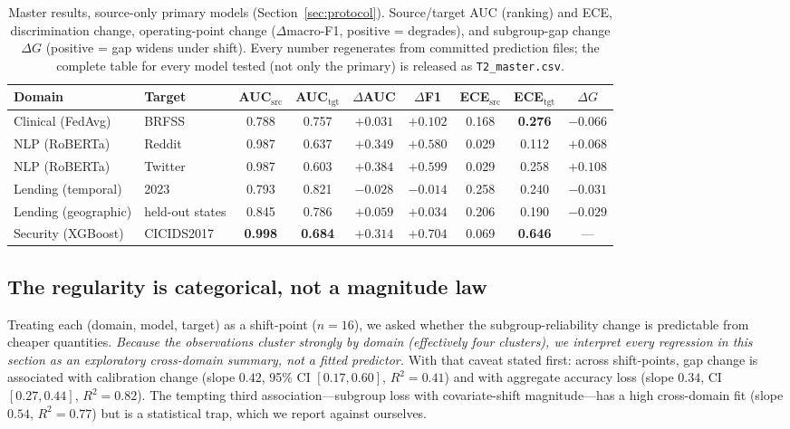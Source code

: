\documentclass[11pt]{article}
\begin{document}
\begin{table}[t]
\centering
\caption{Master results, source-only primary models (Section~\ref{sec:protocol}). Source/target
AUC (ranking) and ECE, discrimination change, operating-point change ($\Delta$macro-F1, positive
= degrades), and subgroup-gap change $\Delta G$ (positive = gap widens under shift). Every number
regenerates from committed prediction files; the complete table for every model tested (not only
the primary) is released as \texttt{T2\_master.csv}.}
\label{tab:master}
\scriptsize
\begin{tabular}{llccccccc}
\toprule
Domain & Target & AUC$_{\text{src}}$ & AUC$_{\text{tgt}}$ & $\Delta$AUC & $\Delta$F1 & ECE$_{\text{src}}$ & ECE$_{\text{tgt}}$ & $\Delta G$ \\
\midrule
\rowcolor{hlrow} Clinical (FedAvg) & BRFSS & 0.788 & 0.757 & $+0.031$ & $+0.102$ & 0.168 & \textbf{0.276} & $-0.066$ \\
NLP (RoBERTa) & Reddit & 0.987 & 0.637 & $\mathbf{+0.349}$ & $+0.580$ & 0.029 & 0.112 & $+0.068$ \\
NLP (RoBERTa) & Twitter & 0.987 & 0.603 & $\mathbf{+0.384}$ & $+0.599$ & 0.029 & 0.258 & $+0.108$ \\
Lending (temporal) & 2023 & 0.793 & 0.821 & $-0.028$ & $-0.014$ & 0.258 & 0.240 & $-0.031$ \\
Lending (geographic) & held-out states & 0.845 & 0.786 & $+0.059$ & $+0.034$ & 0.206 & 0.190 & $-0.029$ \\
Security (XGBoost) & CICIDS2017 & \textbf{0.998} & \textbf{0.684} & $\mathbf{+0.314}$ & $+0.704$ & 0.069 & \textbf{0.646} & --- \\
\bottomrule
\end{tabular}
\end{table}

\subsection{The regularity is categorical, not a magnitude law}\label{sec:meta}

Treating each (domain, model, target) as a shift-point ($n=16$), we asked whether the
subgroup-reliability change is predictable from cheaper quantities. \emph{Because the observations
cluster strongly by domain (effectively four clusters), we interpret every regression in this
section as an exploratory cross-domain summary, not a fitted predictor.} With that caveat stated
first: across shift-points, gap change is associated with calibration change (slope $0.42$, 95\% CI
$[0.17,0.60]$, $R^2=0.41$) and with aggregate accuracy loss (slope $0.34$, CI $[0.27,0.44]$,
$R^2=0.82$). The tempting third association---subgroup loss with covariate-shift magnitude---has a
high cross-domain fit (slope $0.54$, $R^2=0.77$) but is a statistical trap, which we report against
ourselves.
\end{document}
